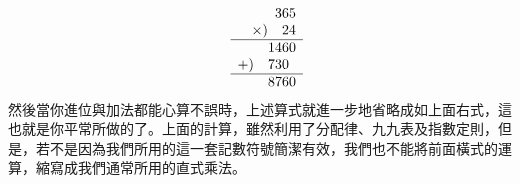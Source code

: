 \begin{example}
\begin{enumerate}[(1)]
\begin{equation*}
\begin{array}{r@{\quad}r}
    &
    \begin{array}{r}
      365 \\
      \times)\quad 24 \\ \hline
      1460 \\
      +) \quad 730\phantom{0} \\ \hline
      8760
    \end{array}
  \end{array}
  \end{equation*}
  然後當你進位與加法都能心算不誤時，上述算式就進一步地省略成如上面右式，這也就是你平常所做的了。上面的計算，雖然利用了分配律、九九表及指數定則，但是，若不是因為我們所用的這一套記數符號簡潔有效，我們也不能將前面橫式的運算，縮寫成我們通常所用的直式乘法。
\end{enumerate}
\end{example}

